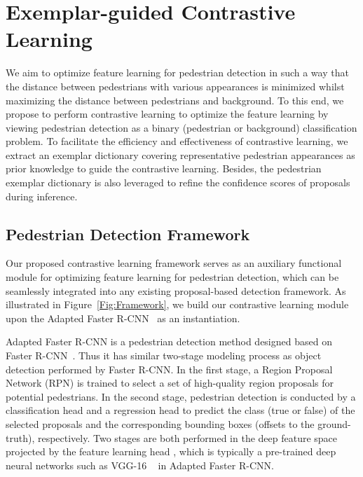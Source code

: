 \documentclass[journal]{IEEEtran}
\begin{document}
\section{Exemplar-guided Contrastive Learning}


We aim to optimize feature learning for pedestrian detection in such a way that the distance between pedestrians with various appearances is minimized whilst maximizing the distance between pedestrians and background. To this end, we propose to perform contrastive learning to optimize the feature learning by viewing pedestrian detection as a binary (pedestrian or background) classification problem. To facilitate the efficiency and effectiveness of contrastive learning, we extract an exemplar dictionary covering representative pedestrian appearances as prior knowledge to guide the contrastive learning. Besides, the pedestrian exemplar dictionary is 
also leveraged to refine the confidence scores of proposals during inference.



\vspace{-7pt}


\subsection{Pedestrian Detection Framework}
Our proposed contrastive learning framework serves as an auxiliary functional module for optimizing feature learning for pedestrian detection, which can be seamlessly integrated into any existing proposal-based detection framework. As illustrated in Figure~\ref{Fig:Framework}, we build our contrastive learning module upon the Adapted Faster R-CNN~\cite{zhang2017citypersons} as an instantiation.

Adapted Faster R-CNN is a pedestrian detection method designed based on Faster R-CNN~\cite{ren2015faster}. Thus it has similar two-stage modeling process as object detection performed by Faster R-CNN. In the first stage, a Region Proposal Network (RPN) is trained to select a set of high-quality region proposals for potential pedestrians. In the second stage, pedestrian detection is conducted by a classification head and a regression head to predict the class (true or false) of the selected proposals and the corresponding bounding boxes (offsets to the ground-truth), respectively. Two stages are both performed in the deep feature space projected by the feature learning head , which is typically a pre-trained deep neural networks such as VGG-16 ~\cite{simonyan2014very} in Adapted Faster R-CNN.
\end{document}
